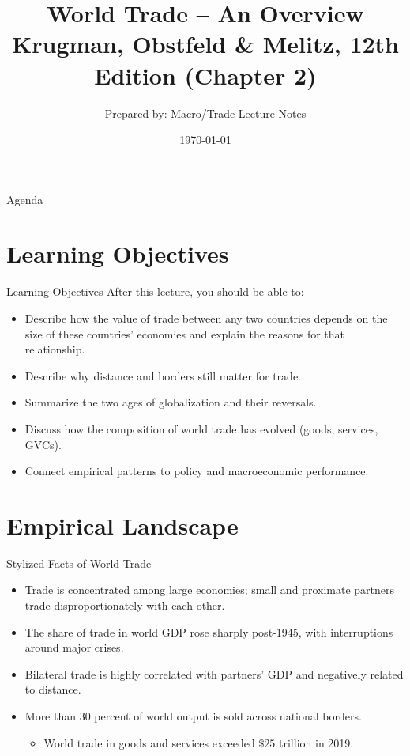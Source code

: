 \documentclass{beamer}
\title[World Trade Overview]{World Trade -- An Overview\\\small{Krugman, Obstfeld \& Melitz, 12th Edition (Chapter 2)}}
\author{Prepared by: Macro/Trade Lecture Notes}
\date{\today}
\begin{document}
\begin{frame}
  \titlepage
\end{frame}

\begin{frame}{Agenda}
\tableofcontents
\end{frame}

\section{Learning Objectives}
\begin{frame}{Learning Objectives}
After this lecture, you should be able to:
\begin{itemize}
  \item Describe how the value of trade between any two countries depends on the size of these countries’ economies and explain the reasons for that relationship.

  \item Describe why distance and borders still matter for trade.
  \item Summarize the two ages of globalization and their reversals.
  \item Discuss how the composition of world trade has evolved (goods, services, GVCs).
  \item Connect empirical patterns to policy and macroeconomic performance.
\end{itemize}
\end{frame}

\section{Empirical Landscape}
\begin{frame}{Stylized Facts of World Trade}
\begin{itemize}
  \item Trade is concentrated among large economies; small and proximate partners trade disproportionately with each other.
  \item The share of trade in world GDP rose sharply post-1945, with interruptions around major crises.\\
  
  \item Bilateral trade is highly correlated with partners' GDP and negatively related to distance.\\
  
 \item More than 30 percent of world output is sold across national borders.\\
 \begin{itemize}
\item World trade in goods and services exceeded $\$25$ trillion in 2019.
 \end{itemize}
\end{itemize}
\end{frame}
\end{document}
